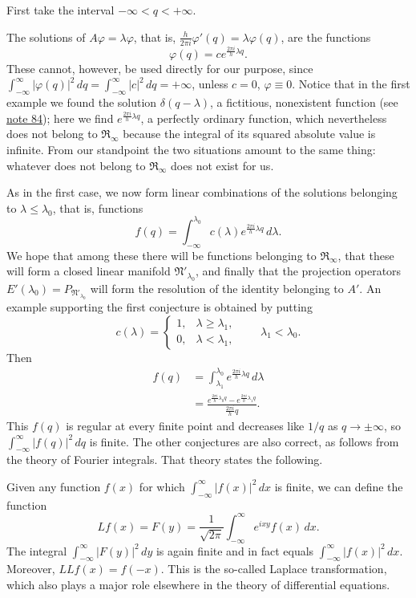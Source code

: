 \documentclass[fontsize=13pt,twoside,openany,headings=normal,parskip=false,bookmarkpackage=false,DIV=calc]{scrbook}
\begin{document}
First take the interval $-\infty<q<+\infty$.

\hypertarget{origpage-69}{}%
The solutions of $A\varphi=\lambda\varphi$, that is, $\frac{h}{2\pi i}\varphi'(q)=\lambda\varphi(q)$, are the functions
\[
\varphi(q)=c e^{\frac{2\pi i}{h}\lambda q}.
\]
These cannot, however, be used directly for our purpose, since $\int_{-\infty}^{\infty}|\varphi(q)|^2\,dq=\int_{-\infty}^{\infty}|c|^2\,dq=+\infty$, unless $c=0$, $\varphi\equiv0$. Notice that in the first example we found the solution $\delta(q-\lambda)$, a fictitious, nonexistent function (see \hyperlink{note-84}{note 84}); here we find $e^{\frac{2\pi i}{h}\lambda q}$, a perfectly ordinary function, which nevertheless does not belong to $\mathfrak{R}_\infty$ because the integral of its squared absolute value is infinite. From our standpoint the two situations amount to the same thing: whatever does not belong to $\mathfrak{R}_\infty$ does not exist for us.

As in the first case, we now form linear combinations of the solutions belonging to $\lambda\leq\lambda_0$, that is, functions
\[
f(q)=\int_{-\infty}^{\lambda_0}c(\lambda)e^{\frac{2\pi i}{h}\lambda q}\,d\lambda.
\]
We hope that among these there will be functions belonging to $\mathfrak{R}_\infty$, that these will form a closed linear manifold $\mathfrak{N}'_{\lambda_0}$, and finally that the projection operators $E'(\lambda_0)=P_{\mathfrak{N}'_{\lambda_0}}$ will form the resolution of the identity belonging to $A'$. An example supporting the first conjecture is obtained by putting
\[
c(\lambda)=\begin{cases}1,&\lambda\geq\lambda_1,\\0,&\lambda<\lambda_1,\end{cases}
\qquad\lambda_1<\lambda_0.
\]
Then
\begin{align*}
f(q)&=\int_{\lambda_1}^{\lambda_0}e^{\frac{2\pi i}{h}\lambda q}\,d\lambda\\
&=\frac{e^{\frac{2\pi i}{h}\lambda_0q}-e^{\frac{2\pi i}{h}\lambda_1q}}{\frac{2\pi i}{h}q}.
\end{align*}
This $f(q)$ is regular at every finite point and decreases like $1/q$ as $q\to\pm\infty$, so $\int_{-\infty}^{\infty}|f(q)|^2\,dq$ is finite. The other conjectures are also correct, as follows from the theory of Fourier integrals. That theory states the following.

Given any function $f(x)$ for which $\int_{-\infty}^{\infty}|f(x)|^2\,dx$ is finite, we can define the function
\[
Lf(x)=F(y)=\frac1{\sqrt{2\pi}}\int_{-\infty}^{\infty}e^{ixy}f(x)\,dx.
\]
The integral $\int_{-\infty}^{\infty}|F(y)|^2\,dy$ is again finite and in fact equals $\int_{-\infty}^{\infty}|f(x)|^2\,dx$. Moreover, $LLf(x)=f(-x)$. This is the so-called Laplace transformation, which also plays a major role elsewhere in the theory of differential equations.
\end{document}
